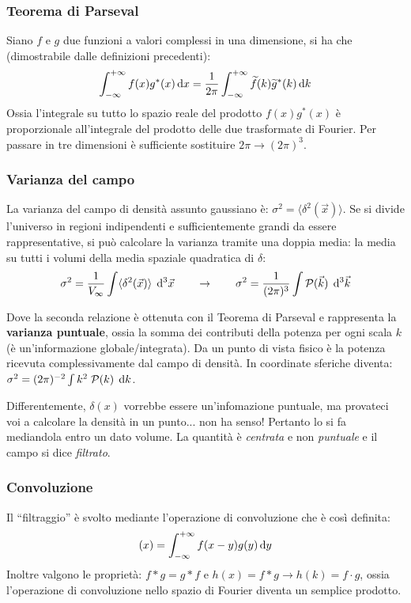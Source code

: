 \subsubsection*{Teorema di Parseval}
Siano $f$ e $g$ due funzioni a valori complessi in una dimensione, si ha che (dimostrabile dalle definizioni precedenti):
\begin{equation*}
    \int^{+\infty}_{-\infty} f(x)g^*(x)\operatorname{d}\!{x} = \frac{1}{2\pi} \int^{+\infty}_{-\infty} \widetilde{ f}(k)\widetilde{g}^*(k)\operatorname{d}\!{k}
\end{equation*}
Ossia l'integrale su tutto lo spazio reale del prodotto $f(x)g^*(x)$ è proporzionale all'integrale del prodotto delle due trasformate di Fourier. Per passare in tre dimensioni è sufficiente sostituire $2\pi\rightarrow (2\pi)^3$. 

\subsubsection*{Varianza del campo}
La varianza del campo di densità assunto gaussiano è: $\sigma^2 = \langle  \delta^2 (\vec{x}) \rangle$. Se si divide l'universo in regioni indipendenti e sufficientemente grandi da essere rappresentative, si può calcolare la varianza tramite una doppia media: la media su tutti i volumi della media spaziale quadratica di $\delta$:
\begin{equation*}
    \sigma^2 = \frac{1}{V_\infty} \int \langle  \delta^2 (\vec{x}) \rangle\; \operatorname{d}\!{^3\vec{x}} \qquad \rightarrow \qquad \sigma^2 = \frac{1}{(2\pi)^3} \int \mathcal{P}(\vec{k}) \; \operatorname{d}\!{^3\vec{k}}
\end{equation*}

Dove la seconda relazione è ottenuta con il Teorema di Parseval e rappresenta la \textbf{varianza puntuale}, ossia la somma dei contributi della potenza per ogni scala $k$ (è un'informazione globale/integrata). Da un punto di vista fisico è la potenza ricevuta complessivamente dal campo di densità. In coordinate sferiche diventa: $\sigma^2 =(2\pi)^{-2} \int  k^2\;\mathcal{P}(k)\; \operatorname{d}\!{k} $. 

Differentemente, $\delta (x)$ vorrebbe essere un'infomazione puntuale, ma provateci voi a calcolare la densità in un punto... non ha senso! Pertanto lo si fa mediandola entro un dato volume. La quantità è \textit{centrata} e non \textit{puntuale} e il campo si dice \textit{filtrato}.

\subsubsection*{Convoluzione}
Il ``filtraggio'' è svolto mediante l'operazione di convoluzione che è così definita:
\begin{equation*}
    [f*g](x) = \int_{-\infty}^{+\infty}f(x-y)g(y)\d{y}
\end{equation*}
Inoltre valgono le proprietà: $f*g=g*f$ e $h(x)=f*g\rightarrow h(k)=f\cdot g$, ossia l'operazione di convoluzione nello spazio di Fourier diventa un semplice prodotto. 

